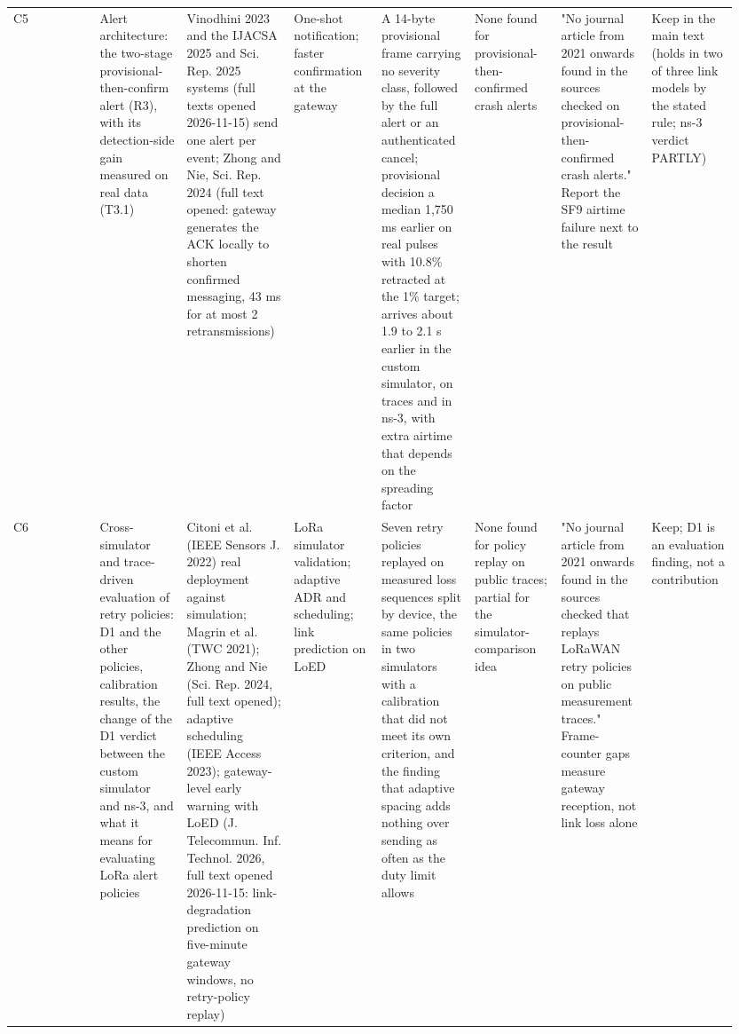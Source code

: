 {\begin{longtable}{p{0.119\linewidth}p{0.119\linewidth}p{0.119\linewidth}p{0.119\linewidth}p{0.119\linewidth}p{0.119\linewidth}p{0.119\linewidth}p{0.119\linewidth}}
C5 & Alert architecture: the two-stage provisional-then-confirm alert (R3), with its detection-side gain measured on real data (T3.1) & Vinodhini 2023 and the IJACSA 2025 and Sci. Rep. 2025 systems (full texts opened 2026-11-15) send one alert per event; Zhong and Nie, Sci. Rep. 2024 (full text opened: gateway generates the ACK locally to shorten confirmed messaging, 43 ms for at most 2 retransmissions) & One-shot notification; faster confirmation at the gateway & A 14-byte provisional frame carrying no severity class, followed by the full alert or an authenticated cancel; provisional decision a median 1,750 ms earlier on real pulses with 10.8\% retracted at the 1\% target; arrives about 1.9 to 2.1 s earlier in the custom simulator, on traces and in ns-3, with extra airtime that depends on the spreading factor & None found for provisional-then-confirmed crash alerts & "No journal article from 2021 onwards found in the sources checked on provisional-then-confirmed crash alerts." Report the SF9 airtime failure next to the result & Keep in the main text (holds in two of three link models by the stated rule; ns-3 verdict PARTLY) \\
C6 & Cross-simulator and trace-driven evaluation of retry policies: D1 and the other policies, calibration results, the change of the D1 verdict between the custom simulator and ns-3, and what it means for evaluating LoRa alert policies & Citoni et al. (IEEE Sensors J. 2022) real deployment against simulation; Magrin et al. (TWC 2021); Zhong and Nie (Sci. Rep. 2024, full text opened); adaptive scheduling (IEEE Access 2023); gateway-level early warning with LoED (J. Telecommun. Inf. Technol. 2026, full text opened 2026-11-15: link-degradation prediction on five-minute gateway windows, no retry-policy replay) & LoRa simulator validation; adaptive ADR and scheduling; link prediction on LoED & Seven retry policies replayed on measured loss sequences split by device, the same policies in two simulators with a calibration that did not meet its own criterion, and the finding that adaptive spacing adds nothing over sending as often as the duty limit allows & None found for policy replay on public traces; partial for the simulator-comparison idea & "No journal article from 2021 onwards found in the sources checked that replays LoRaWAN retry policies on public measurement traces." Frame-counter gaps measure gateway reception, not link loss alone & Keep; D1 is an evaluation finding, not a contribution \\

\end{longtable}}
